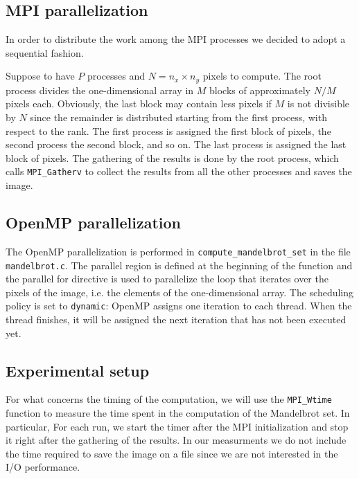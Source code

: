 \subsection{MPI parallelization}

In order to distribute the work among the MPI processes we decided to adopt a sequential fashion.

Suppose to have $P$ processes and $N = n_x \times n_y$ pixels to compute. The root process divides the one-dimensional array in $M$ blocks of approximately $N/M$ pixels each. Obviously, the last block may contain less pixels if $M$ is not divisible by $N$ since the remainder is distributed starting from the first process, with respect to the rank. The first process is assigned the first block of pixels, the second process the second block, and so on. The last process is assigned the last block of pixels. The gathering of the results is done by the root process, which calls \texttt{MPI\_Gatherv} to collect the results from all the other processes and saves the image.

\subsection{OpenMP parallelization}

The OpenMP parallelization is performed in \texttt{compute\_mandelbrot\_set} in the file \texttt{mandelbrot.c}. The parallel region is defined at the beginning of the function and the parallel for directive is used to parallelize the loop that iterates over the pixels of the image, i.e. the elements of the one-dimensional array. The scheduling policy is set to \texttt{dynamic}: OpenMP assigns one iteration to each thread. When the thread finishes, it will be assigned the next iteration that has not been executed yet.

\subsection{Experimental setup}

For what concerns the timing of the computation, we will use the \texttt{MPI\_Wtime} function to measure the time spent in the computation of the Mandelbrot set. In particular, For each run, we start the timer after the MPI initialization and stop it right after the gathering of the results. In our measurments we do not include the time required to save the image on a file since we are not interested in the I/O performance.

